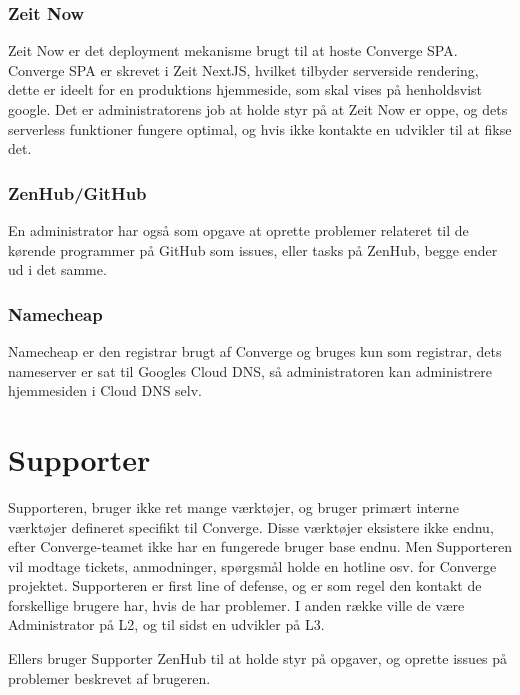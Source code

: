 \subsubsection{Zeit Now}

Zeit Now er det deployment mekanisme brugt til at hoste Converge SPA. Converge SPA er skrevet i Zeit NextJS, hvilket tilbyder serverside rendering, dette er ideelt for en produktions hjemmeside, som skal vises på henholdsvist google. Det er administratorens job at holde styr på at Zeit Now er oppe, og dets serverless funktioner fungere optimal, og hvis ikke kontakte en udvikler til at fikse det.

\subsubsection{ZenHub/GitHub}

En administrator har også som opgave at oprette problemer relateret til de kørende programmer på GitHub som issues, eller tasks på ZenHub, begge ender ud i det samme.

\subsubsection{Namecheap}

Namecheap er den registrar brugt af Converge og bruges kun som registrar, dets nameserver er sat til Googles Cloud DNS, så administratoren kan administrere hjemmesiden i Cloud DNS selv.

\section{Supporter}

Supporteren, bruger ikke ret mange værktøjer, og bruger primært interne værktøjer defineret specifikt til Converge. Disse værktøjer eksistere ikke endnu, efter Converge-teamet ikke har en fungerede bruger base endnu. Men Supporteren vil modtage tickets, anmodninger, spørgsmål holde en hotline osv. for Converge projektet. Supporteren er first line of defense, og er som regel den kontakt de forskellige brugere har, hvis de har problemer. I anden række ville de være Administrator på L2, og til sidst en udvikler på L3.

Ellers bruger Supporter ZenHub til at holde styr på opgaver, og oprette issues på problemer beskrevet af brugeren.